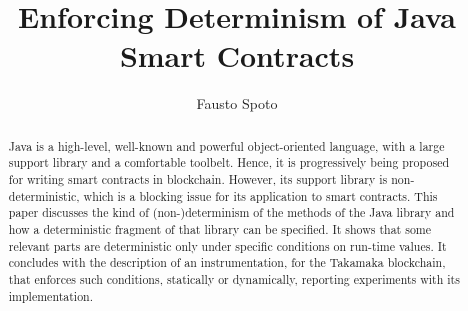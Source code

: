 \documentclass[orivec]{llncs}
\begin{document}
%
\begin{frontmatter}
  \title{Enforcing Determinism of Java Smart Contracts}
\author{Fausto Spoto}
%
\maketitle
%
\begin{abstract}
  Java is a high-level, well-known and powerful object-oriented
  language, with a large support library and a comfortable toolbelt.
  Hence, it is progressively being proposed for writing smart contracts
  in blockchain. However, its support library is non-deterministic,
  which is a blocking issue for its application to smart contracts.
  This paper discusses the kind of (non-)determinism of the methods
  of the Java library and how a deterministic fragment of that library can be specified.
  It shows that some relevant parts are deterministic
  only under specific conditions on run-time values.
  It concludes with the description of
  an instrumentation, for the Takamaka blockchain,
  that enforces such conditions, statically or dynamically,
  reporting experiments with its implementation.
\end{abstract}
%
\end{frontmatter}










\end{document}
